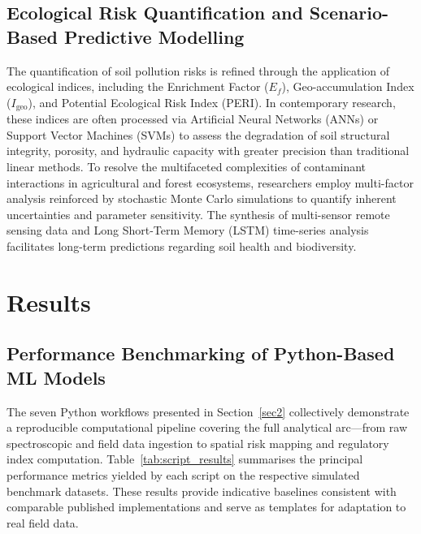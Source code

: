 \documentclass[environments,article,submit,pdftex,moreauthors]{Definitions/mdpi}
\begin{document}
\subsection{Ecological Risk Quantification and Scenario-Based Predictive
    Modelling}\label{sec4.2}

The quantification of soil pollution risks is refined through the application
of ecological indices, including the Enrichment Factor ($E_f$),
Geo-accumulation Index ($I_{\text{geo}}$), and Potential Ecological Risk
Index (PERI). In contemporary research, these indices are often processed via
Artificial Neural Networks (ANNs) or Support Vector Machines (SVMs) to assess
the degradation of soil structural integrity, porosity, and hydraulic capacity
with greater precision than traditional linear methods. To resolve the
multifaceted complexities of contaminant interactions in agricultural and
forest ecosystems, researchers employ multi-factor analysis reinforced by
stochastic Monte Carlo simulations to quantify inherent uncertainties and
parameter sensitivity. The synthesis of multi-sensor remote sensing data and
Long Short-Term Memory (LSTM) time-series analysis facilitates long-term
predictions regarding soil health and biodiversity.

\section{Results}\label{sec5}

\subsection{Performance Benchmarking of Python-Based ML Models}\label{sec5.1}

The seven Python workflows presented in Section~\ref{sec2} collectively
demonstrate a reproducible computational pipeline covering the full analytical
arc---from raw spectroscopic and field data ingestion to spatial risk mapping
and regulatory index computation. Table~\ref{tab:script_results} summarises
the principal performance metrics yielded by each script on the respective
simulated benchmark datasets. These results provide indicative baselines
consistent with comparable published implementations and serve as templates
for adaptation to real field data.
\end{document}
